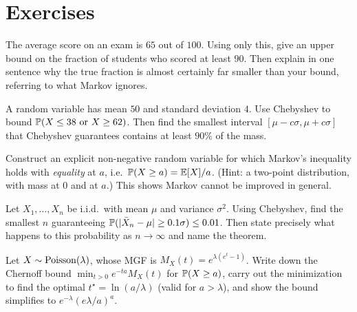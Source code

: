 \section{Exercises}
\label{ch19:exercises}

\begin{exercise}
\label{ch19:ex-markov}
The average score on an exam is $65$ out of $100$. Using only this, give an
upper bound on the fraction of students who scored at least $90$. Then explain
in one sentence why the true fraction is almost certainly far smaller than
your bound, referring to what Markov ignores.
\end{exercise}

\begin{exercise}
\label{ch19:ex-cheb}
A random variable has mean $50$ and standard deviation $4$. Use Chebyshev to
bound $\P(X \le 38 \text{ or } X \ge 62)$. Then find the smallest interval
$[\mu - c\sigma, \mu + c\sigma]$ that Chebyshev guarantees contains at least
$90\%$ of the mass.
\end{exercise}

\begin{exercise}
\label{ch19:ex-sharp}
Construct an explicit non-negative random variable for which Markov's
inequality holds with \emph{equality} at $a$, i.e.\ $\P(X\ge a) = \E[X]/a$.
(Hint: a two-point distribution, with mass at $0$ and at $a$.) This shows
Markov cannot be improved in general.
\end{exercise}

\begin{exercise}
\label{ch19:ex-wlln}
Let $X_1,\dots,X_n$ be i.i.d.\ with mean $\mu$ and variance $\sigma^2$. Using
Chebyshev, find the smallest $n$ guaranteeing
$\P(\abs{\bar X_n - \mu} \ge 0.1\sigma) \le 0.01$. Then state precisely what
happens to this probability as $n\to\infty$ and name the theorem.
\end{exercise}

\begin{exercise}
\label{ch19:ex-chernoff-pois}
Let $X \sim \Pois(\lambda)$, whose MGF is $M_X(t) = e^{\lambda(e^t - 1)}$.
Write down the Chernoff bound $\min_{t>0} e^{-ta}M_X(t)$ for $\P(X \ge a)$,
carry out the minimization to find the optimal $t^\star = \ln(a/\lambda)$
(valid for $a>\lambda$), and show the bound simplifies to
$e^{-\lambda}(e\lambda/a)^a$.
\end{exercise}

